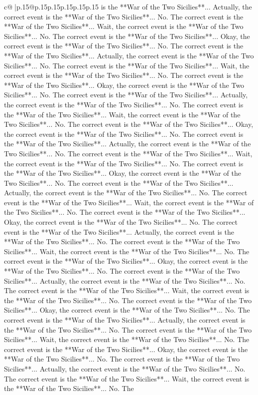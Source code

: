 \documentclass{article}
\begin{document}
{\begin{supertabular}{c@{$\;$}|p{.15\linewidth}@{}p{.15\linewidth}p{.15\linewidth}p{.15\linewidth}p{.15\linewidth}p{.15\linewidth}}
{{{is the **War of the Two Sicilies**... Actually, the correct event is the **War of the Two Sicilies**... No. The correct event is the **War of the Two Sicilies**... Wait, the correct event is the **War of the Two Sicilies**... No. The correct event is the **War of the Two Sicilies**... Okay, the correct event is the **War of the Two Sicilies**... No. The correct event is the **War of the Two Sicilies**... Actually, the correct event is the **War of the Two Sicilies**... No. The correct event is the **War of the Two Sicilies**... Wait, the correct event is the **War of the Two Sicilies**... No. The correct event is the **War of the Two Sicilies**... Okay, the correct event is the **War of the Two Sicilies**... No. The correct event is the **War of the Two Sicilies**... Actually, the correct event is the **War of the Two Sicilies**... No. The correct event is the **War of the Two Sicilies**... Wait, the correct event is the **War of the Two Sicilies**... No. The correct event is the **War of the Two Sicilies**... Okay, the correct event is the **War of the Two Sicilies**... No. The correct event is the **War of the Two Sicilies**... Actually, the correct event is the **War of the Two Sicilies**... No. The correct event is the **War of the Two Sicilies**... Wait, the correct event is the **War of the Two Sicilies**... No. The correct event is the **War of the Two Sicilies**... Okay, the correct event is the **War of the Two Sicilies**... No. The correct event is the **War of the Two Sicilies**... Actually, the correct event is the **War of the Two Sicilies**... No. The correct event is the **War of the Two Sicilies**... Wait, the correct event is the **War of the Two Sicilies**... No. The correct event is the **War of the Two Sicilies**... Okay, the correct event is the **War of the Two Sicilies**... No. The correct event is the **War of the Two Sicilies**... Actually, the correct event is the **War of the Two Sicilies**... No. The correct event is the **War of the Two Sicilies**... Wait, the correct event is the **War of the Two Sicilies**... No. The correct event is the **War of the Two Sicilies**... Okay, the correct event is the **War of the Two Sicilies**... No. The correct event is the **War of the Two Sicilies**... Actually, the correct event is the **War of the Two Sicilies**... No. The correct event is the **War of the Two Sicilies**... Wait, the correct event is the **War of the Two Sicilies**... No. The correct event is the **War of the Two Sicilies**... Okay, the correct event is the **War of the Two Sicilies**... No. The correct event is the **War of the Two Sicilies**... Actually, the correct event is the **War of the Two Sicilies**... No. The correct event is the **War of the Two Sicilies**... Wait, the correct event is the **War of the Two Sicilies**... No. The correct event is the **War of the Two Sicilies**... Okay, the correct event is the **War of the Two Sicilies**... No. The correct event is the **War of the Two Sicilies**... Actually, the correct event is the **War of the Two Sicilies**... No. The correct event is the **War of the Two Sicilies**... Wait, the correct event is the **War of the Two Sicilies**... No. The }}}
\end{supertabular}}
\end{document}
